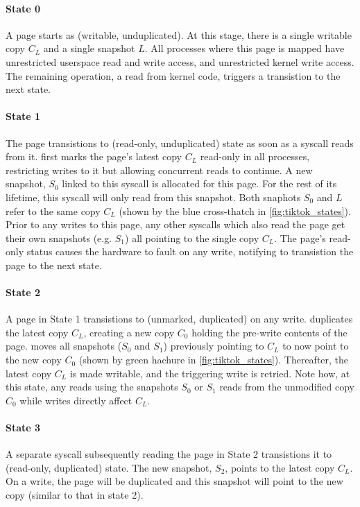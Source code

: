 \documentclass[letterpaper,twocolumn,10pt, anonymous]{article}
\begin{document}
\paragraph{State 0}
A page starts as (writable, unduplicated). 
At this stage, there is a single writable copy $C_L$ and a single snapshot $L$. 
All processes where this page is mapped have unrestricted userspace read and write 
access, and unrestricted kernel write access.
The remaining operation, a read from kernel code, triggers a transistion to 
the next state.

\paragraph{State 1}
The page transistions to (read-only, unduplicated) state as soon as a syscall 
reads from it. 
\tiktok first marks the page's latest copy $C_L$ read-only in all processes, 
restricting writes to it but allowing concurrent reads to continue.
A new snapshot, $S_0$ linked to this syscall is allocated for this page.
For the rest of its lifetime, this syscall will only read from this snapshot.
Both snaphots $S_0$ and $L$ refer to the same copy $C_L$ (shown by the 
blue cross-thatch in \autoref{fig:tiktok_states}).
Prior to any writes to this page, any other syscalls which also read the page  
get their own snapshots (e.g. $S_1$) all pointing to the single copy $C_L$.
The page's read-only status causes the hardware to fault on any write,
notifying \tiktok to transistion the page to the next state.

\paragraph{State 2}
A page in State 1 transistions to (unmarked, duplicated) on any write.
\tiktok duplicates the latest copy $C_L$, creating a new copy $C_0$ holding
the pre-write contents of the page.
\tiktok moves all snapshots ($S_0$ and $S_1$) previously pointing to 
$C_L$ to now point to the new copy $C_0$ (shown by green hachure in 
\autoref{fig:tiktok_states}). 
Thereafter, the latest copy $C_L$ is made writable, and the triggering write 
is retried. 
Note how, at this state, any reads using the snapshots $S_0$ or $S_1$ reads 
from the unmodified copy $C_0$ while writes directly affect $C_L$.

\paragraph{State 3}
A separate syscall subsequently reading the page in State 2 transistions 
it to (read-only, duplicated) state. 
The new snapshot, $S_2$, points to the latest copy $C_L$.
On a write, the page will be duplicated and this snapshot 
will point to the new copy (similar to that in state 2).
\end{document}

